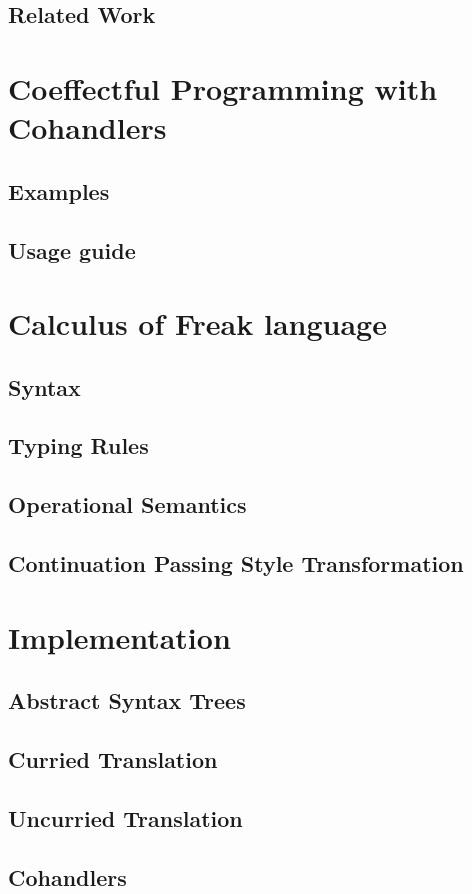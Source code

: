 \documentclass[declaration,shortabstract]{iithesis}
\begin{document}
\section{Related Work}

\chapter{Coeffectful Programming with Cohandlers}
\section{Examples}
\section{Usage guide}

\chapter{Calculus of Freak language}
\section{Syntax}
\section{Typing Rules}
\section{Operational Semantics}
\section{Continuation Passing Style Transformation}

\chapter{Implementation}
\section{Abstract Syntax Trees}
\section{Curried Translation}
\section{Uncurried Translation}
\section{Cohandlers}
\end{document}
